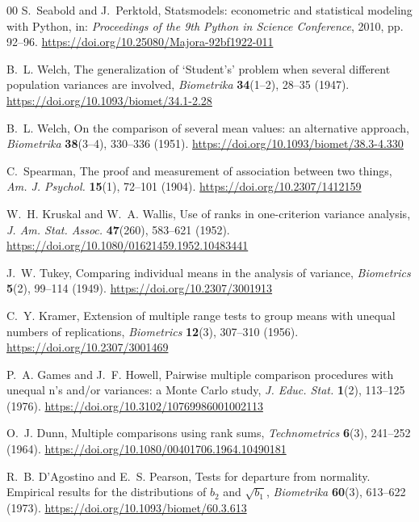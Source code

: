 \documentclass[11pt,a4paper]{article}
\begin{document}
{\begin{thebibliography}{00}
S.~Seabold and J.~Perktold,
\newblock Statsmodels: econometric and statistical modeling with Python,
\newblock in: \emph{Proceedings of the 9th Python in Science Conference},
  2010, pp. 92--96.
\newblock \url{https://doi.org/10.25080/Majora-92bf1922-011}

B.~L. Welch,
\newblock The generalization of `Student's' problem when several different
  population variances are involved,
\newblock \emph{Biometrika} \textbf{34}(1--2), 28--35 (1947).
\newblock \url{https://doi.org/10.1093/biomet/34.1-2.28}

B.~L. Welch,
\newblock On the comparison of several mean values: an alternative approach,
\newblock \emph{Biometrika} \textbf{38}(3--4), 330--336 (1951).
\newblock \url{https://doi.org/10.1093/biomet/38.3-4.330}

C.~Spearman,
\newblock The proof and measurement of association between two things,
\newblock \emph{Am. J. Psychol.} \textbf{15}(1), 72--101 (1904).
\newblock \url{https://doi.org/10.2307/1412159}

W.~H. Kruskal and W.~A. Wallis,
\newblock Use of ranks in one-criterion variance analysis,
\newblock \emph{J. Am. Stat. Assoc.} \textbf{47}(260), 583--621 (1952).
\newblock \url{https://doi.org/10.1080/01621459.1952.10483441}

J.~W. Tukey,
\newblock Comparing individual means in the analysis of variance,
\newblock \emph{Biometrics} \textbf{5}(2), 99--114 (1949).
\newblock \url{https://doi.org/10.2307/3001913}

C.~Y. Kramer,
\newblock Extension of multiple range tests to group means with unequal
  numbers of replications,
\newblock \emph{Biometrics} \textbf{12}(3), 307--310 (1956).
\newblock \url{https://doi.org/10.2307/3001469}

P.~A. Games and J.~F. Howell,
\newblock Pairwise multiple comparison procedures with unequal n's and/or
  variances: a Monte Carlo study,
\newblock \emph{J. Educ. Stat.} \textbf{1}(2), 113--125 (1976).
\newblock \url{https://doi.org/10.3102/10769986001002113}

O.~J. Dunn,
\newblock Multiple comparisons using rank sums,
\newblock \emph{Technometrics} \textbf{6}(3), 241--252 (1964).
\newblock \url{https://doi.org/10.1080/00401706.1964.10490181}

R.~B. D'Agostino and E.~S. Pearson,
\newblock Tests for departure from normality. Empirical results for the
  distributions of $b_2$ and $\sqrt{b_1}$,
\newblock \emph{Biometrika} \textbf{60}(3), 613--622 (1973).
\newblock \url{https://doi.org/10.1093/biomet/60.3.613}


\end{thebibliography}}
\end{document}
